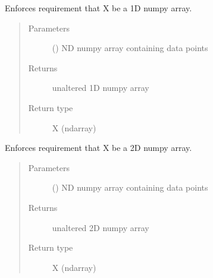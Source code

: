 \documentclass[letterpaper,10pt,english]{sphinxmanual}
\begin{document}
\begin{fulllineitems}
\label{\detokenize{rom:rom.utils.check_1D}}
\sphinxAtStartPar
Enforces requirement that X be a 1D numpy array.
\begin{quote}\begin{description}
\item[{Parameters}] \leavevmode
\sphinxAtStartPar
{} () \textendash{} ND numpy array containing data points

\item[{Returns}] \leavevmode
\sphinxAtStartPar
unaltered 1D numpy array

\item[{Return type}] \leavevmode
\sphinxAtStartPar
X (ndarray)

\end{description}\end{quote}

\end{fulllineitems}


\begin{fulllineitems}
\label{\detokenize{rom:rom.utils.check_2D}}
\sphinxAtStartPar
Enforces requirement that X be a 2D numpy array.
\begin{quote}\begin{description}
\item[{Parameters}] \leavevmode
\sphinxAtStartPar
{} () \textendash{} ND numpy array containing data points

\item[{Returns}] \leavevmode
\sphinxAtStartPar
unaltered 2D numpy array

\item[{Return type}] \leavevmode
\sphinxAtStartPar
X (ndarray)

\end{description}\end{quote}

\end{fulllineitems}
\end{document}
